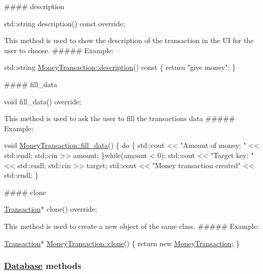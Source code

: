 \#\#\#\# description 
\begin{DoxyCode}
std::string description() \textcolor{keyword}{const override};
\end{DoxyCode}
 This method is used to show the description of the transaction in the UI for the user to choose. \#\#\#\#\# Example\+: 
\begin{DoxyCode}
std::string \mbox{\hyperlink{classMoneyTransaction_a23b793077f5c5e3157155df148e0d5e1}{MoneyTransaction::description}}()\textcolor{keyword}{ const }\{
    \textcolor{keywordflow}{return} \textcolor{stringliteral}{"give money"};
\}
\end{DoxyCode}
 \#\#\#\# fill\+\_\+data 
\begin{DoxyCode}
\textcolor{keywordtype}{void} fill\_data() \textcolor{keyword}{override};
\end{DoxyCode}
 This method is used to ask the user to fill the transaction\textquotesingle{}s data \#\#\#\#\# Example\+: 
\begin{DoxyCode}
\textcolor{keywordtype}{void} \mbox{\hyperlink{classMoneyTransaction_a8666737a342f5eb1856006cd970967bf}{MoneyTransaction::fill\_data}}() \{
    \textcolor{keywordflow}{do} \{
        std::cout << \textcolor{stringliteral}{"Amount of money: "} << std::endl;
        std::cin >> amount;
    \}\textcolor{keywordflow}{while}(amount < 0);
    std::cout << \textcolor{stringliteral}{"Target key: "} << std::endl;
    std::cin >> target;
    std::cout << \textcolor{stringliteral}{"Money transaction created"} << std::endl;
\}
\end{DoxyCode}
 \#\#\#\# clone 
\begin{DoxyCode}
\mbox{\hyperlink{classTransaction}{Transaction}}* clone() \textcolor{keyword}{override};
\end{DoxyCode}
 This method is used to create a new object of the same class. \#\#\#\#\# Example\+: 
\begin{DoxyCode}
\mbox{\hyperlink{classTransaction}{Transaction}}* \mbox{\hyperlink{classMoneyTransaction_af777b46f577df3c089a44c78c1aebc40}{MoneyTransaction::clone}}() \{
    \textcolor{keywordflow}{return} \textcolor{keyword}{new} \mbox{\hyperlink{classMoneyTransaction}{MoneyTransaction}};
\}
\end{DoxyCode}
 \subsubsection*{\mbox{\hyperlink{classDatabase}{Database}} methods}

